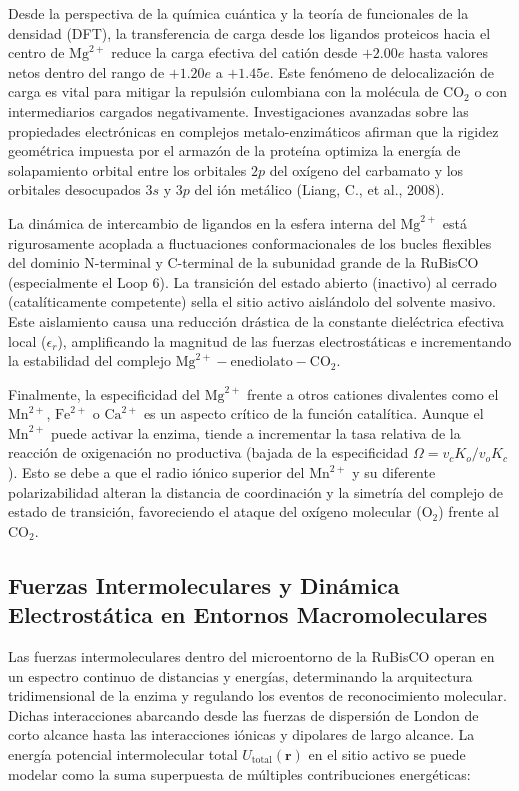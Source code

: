 \documentclass[12pt]{article}
\begin{document}
Desde la perspectiva de la química cuántica y la teoría de funcionales de la densidad (DFT), la transferencia de carga desde los ligandos proteicos hacia el centro de $\text{Mg}^{2+}$ reduce la carga efectiva del catión desde $+2.00 e$ hasta valores netos dentro del rango de $+1.20 e$ a $+1.45 e$. Este fenómeno de delocalización de carga es vital para mitigar la repulsión culombiana con la molécula de $\text{CO}_2$ o con intermediarios cargados negativamente. Investigaciones avanzadas sobre las propiedades electrónicas en complejos metalo-enzimáticos afirman que la rigidez geométrica impuesta por el armazón de la proteína optimiza la energía de solapamiento orbital entre los orbitales $2p$ del oxígeno del carbamato y los orbitales desocupados $3s$ y $3p$ del ión metálico (Liang, C., et al., 2008).

La dinámica de intercambio de ligandos en la esfera interna del $\text{Mg}^{2+}$ está rigurosamente acoplada a fluctuaciones conformacionales de los bucles flexibles del dominio N-terminal y C-terminal de la subunidad grande de la RuBisCO (especialmente el Loop 6). La transición del estado abierto (inactivo) al cerrado (catalíticamente competente) sella el sitio activo aislándolo del solvente masivo. Este aislamiento causa una reducción drástica de la constante dieléctrica efectiva local ($\epsilon_r$), amplificando la magnitud de las fuerzas electrostáticas e incrementando la estabilidad del complejo $\text{Mg}^{2+}-\text{enediolato}-\text{CO}_2$.

Finalmente, la especificidad del $\text{Mg}^{2+}$ frente a otros cationes divalentes como el $\text{Mn}^{2+}$, $\text{Fe}^{2+}$ o $\text{Ca}^{2+}$ es un aspecto crítico de la función catalítica. Aunque el $\text{Mn}^{2+}$ puede activar la enzima, tiende a incrementar la tasa relativa de la reacción de oxigenación no productiva (bajada de la especificidad $\Omega = v_c K_o / v_o K_c$). Esto se debe a que el radio iónico superior del $\text{Mn}^{2+}$ y su diferente polarizabilidad alteran la distancia de coordinación y la simetría del complejo de estado de transición, favoreciendo el ataque del oxígeno molecular ($\text{O}_2$) frente al $\text{CO}_2$.

\subsection{Fuerzas Intermoleculares y Dinámica Electrostática en Entornos Macromoleculares}

Las fuerzas intermoleculares dentro del microentorno de la RuBisCO operan en un espectro continuo de distancias y energías, determinando la arquitectura tridimensional de la enzima y regulando los eventos de reconocimiento molecular. Dichas interacciones abarcando desde las fuerzas de dispersión de London de corto alcance hasta las interacciones iónicas y dipolares de largo alcance. La energía potencial intermolecular total $U_{\text{total}}(\mathbf{r})$ en el sitio activo se puede modelar como la suma superpuesta de múltiples contribuciones energéticas:
\end{document}
